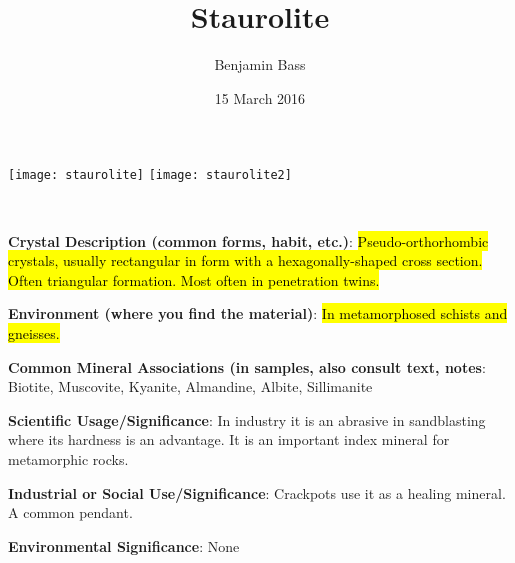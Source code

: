 \documentclass[10pt]{article}
\author{Benjamin Bass}
\date{15 March 2016}
\title{\vspace{-2.0cm}Staurolite} %
\begin{document}
\maketitle


\begin{center}
  \texttt{[image: staurolite]}
  \texttt{[image: staurolite2]}
\end{center}



\
\
\
\
\
\
\
\
\
\

\begin{framed}
  \textbf{Crystal Description (common forms, habit, etc.)}: \hl{Pseudo-orthorhombic crystals, usually rectangular in form with a hexagonally-shaped cross section. Often triangular formation. Most often in penetration twins.}
\end{framed}

\begin{framed}
  \textbf{Environment (where you find the material)}: \hl{In metamorphosed schists and gneisses.}
\end{framed}

\begin{framed}
  \textbf{Common Mineral Associations (in samples, also consult text, notes}: Biotite, Muscovite, Kyanite, Almandine, Albite, Sillimanite
\end{framed}

\begin{framed}
  \textbf{Scientific Usage/Significance}: In industry it is an abrasive in sandblasting where its hardness is an advantage. It is an important index mineral for metamorphic rocks.
\end{framed}

\begin{framed}
  \textbf{Industrial or Social Use/Significance}: Crackpots use it as a healing mineral. A common pendant.
\end{framed}

\begin{framed}
  \textbf{Environmental Significance}: None
\end{framed}

\end{document}
